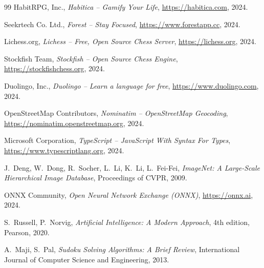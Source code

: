 \documentclass[12pt, a4paper, twoside]{report}
\numberwithin{equation}{section}
\begin{document}
\begin{thebibliography}{99}
HabitRPG, Inc.,
\textit{Habitica -- Gamify Your Life},
\url{https://habitica.com}, 2024.

Seekrtech Co. Ltd.,
\textit{Forest -- Stay Focused},
\url{https://www.forestapp.cc}, 2024.

Lichess.org,
\textit{Lichess -- Free, Open Source Chess Server},
\url{https://lichess.org}, 2024.

Stockfish Team,
\textit{Stockfish -- Open Source Chess Engine},
\url{https://stockfishchess.org}, 2024.

Duolingo, Inc.,
\textit{Duolingo -- Learn a language for free},
\url{https://www.duolingo.com}, 2024.

OpenStreetMap Contributors,
\textit{Nominatim -- OpenStreetMap Geocoding},
\url{https://nominatim.openstreetmap.org}, 2024.

Microsoft Corporation,
\textit{TypeScript -- JavaScript With Syntax For Types},
\url{https://www.typescriptlang.org}, 2024.

J.~Deng, W.~Dong, R.~Socher, L.~Li, K.~Li, L.~Fei-Fei,
\textit{ImageNet: A Large-Scale Hierarchical Image Database},
Proceedings of CVPR, 2009.

ONNX Community,
\textit{Open Neural Network Exchange (ONNX)},
\url{https://onnx.ai}, 2024.

S.~Russell, P.~Norvig,
\textit{Artificial Intelligence: A Modern Approach}, 4th edition,
Pearson, 2020.

A.~Maji, S.~Pal,
\textit{Sudoku Solving Algorithms: A Brief Review},
International Journal of Computer Science and Engineering, 2013.

\end{thebibliography}
\end{document}

